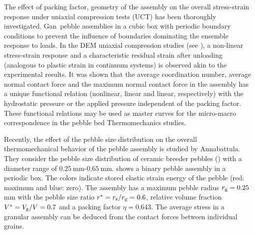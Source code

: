 The effect of packing factor, geometry of the assembly on the overall stress-strain response under uniaxial compression tests (UCT) has been thoroughly investigated.\cite{Gan:2010uq} Gan\etal~pebble assemblies in a cubic box with periodic boundary conditions to prevent the influence of boundaries dominating the ensemble response to loads.\cite{Gilabert2007} In the DEM uniaxial compression studies (see ), a non-linear stress-strain response and a characteristic residual strain after unloading (analogous to plastic strain in continuum systems) is observed akin to the experimental results.\cite{Reimann:2000tw} It was shown that the average coordination number, average normal contact force and the maximum normal contact force in the assembly has a unique functional relation (nonlinear, linear and linear, respectively) with the hydrostatic pressure or the applied pressure independent of the packing factor.\cite{Gan:2010uq,An20071393} These functional relations may be used as master curves for the micro-macro correspondence in the pebble bed Thermomechanics studies.

Recently, the effect of the pebble size distribution on the overall thermomechanical behavior of the pebble assembly is studied by Annabattula\etal\cite{Annabattula2011}. They consider the pebble size distribution of ceramic breeder pebbles (\lis) with a diameter range of $0.25\ \mathrm{mm}$-$0.65\ \mathrm{mm}$.  shows a binary pebble assembly in a periodic box. The colors indicate stored elastic strain energy of the pebble (red: maximum and blue: zero). The assembly has a maximum pebble radius $r_{\mathrm{g}}=0.25$ mm with the pebble size ratio $r^{*}=r_{\mathrm{s}}/r_{\mathrm{g}}=0.6$, relative volume fraction $V^{*}=V_{\mathrm{g}}/V=0.7$ and a packing factor $\eta=0.643$. The average stress in a granular assembly can be deduced from the contact forces between individual grains.


